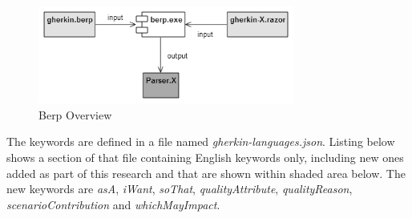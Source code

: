 \documentclass[dissertation,final]{softeng}
\begin{document}
\begin{figure}[h!]
\includegraphics[width=0.75\textwidth]{berp_overview}
\centering
\caption[Berp Overview]{Berp Overview~\footnotemark}
\label{fig:berp_overview}
\end{figure}

The keywords are defined in a file named \emph{gherkin-languages.json}. Listing below shows a section of that file containing English keywords only, including new ones added as part of this research and that are shown within shaded area below. The new keywords are \emph{asA}, \emph{iWant}, \emph{soThat}, \emph{qualityAttribute}, \emph{qualityReason}, \emph{scenarioContribution} and \emph{whichMayImpact}. 

\end{document}
